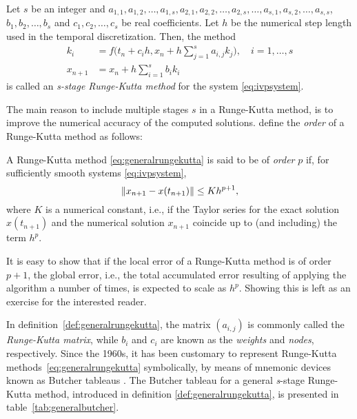\begin{defn}
    \label{def:generalrungekutta}
    Let $s$ be an integer and $a_{1,1},a_{1,2},\ldots,a_{1,s},a_{2,1},
    a_{2,2},\ldots,a_{2,s},\ldots,a_{s,1},a_{s,2},\ldots,a_{s,s}$,
    $b_{1},b_{2},\ldots,b_{s}$ and $c_{1},c_{2},\ldots,c_{s}$ be real
    coefficients. Let $h$ be the numerical step length used in the
    temporal discretization. Then, the method
\begin{equation}
    \label{eq:generalrungekutta}
    \begin{aligned}
        k_{i} &= f\bigg(t_{n}+c_{i}h,x_{n}+
                h\sum\limits_{j=1}^{s}a_{i,j}k_{j}\bigg),\quad{}i=1,\ldots,s\\
        x_{n+1} &= x_{n} + h\sum\limits_{i=1}^{s}b_{i}k_{i}
    \end{aligned}
\end{equation}
is called an \emph{s-stage Runge-Kutta method} for the system
\eqref{eq:ivpsystem}.
\end{defn}


The main reason to include multiple stages $s$ in a Runge-Kutta method,
is to improve the numerical accuracy of the computed solutions.
\textcite[p.134]{hairer1993solving} define the \emph{order}
of a Runge-Kutta method as follows:\\

\begin{defn}
    \label{def:rungekuttaorder}
    A Runge-Kutta method \eqref{eq:generalrungekutta} is said to be of
    \emph{order} $p$ if, for sufficiently smooth systems \eqref{eq:ivpsystem},
    \begin{equation}
        \label{eq:rungekuttaorder}
        \norm{x_{n+1}-x(t_{n+1})} \leq Kh^{p+1},
    \end{equation}
    where $K$ is a numerical constant, i.e., if the Taylor series for the exact
    solution $x(t_{n+1})$ and the numerical solution $x_{n+1}$ coincide up to
    (and including) the term $h^p$.
\end{defn}

It is easy to show that if the local error of a Runge-Kutta method is of order
$p+1$, the global error, i.e., the total accumulated error resulting of
applying the algorithm a number of times, is expected to scale as $h^{p}$.
Showing this is left as an exercise for the interested reader.

In definition~\ref{def:generalrungekutta}, the matrix $(a_{i,j})$ is commonly
called the \emph{Runge-Kutta matrix}, while $b_{i}$ and $c_{i}$ are known as
the \emph{weights} and \emph{nodes}, respectively.  Since the 1960s, it has
been customary to represent Runge-Kutta methods~\eqref{eq:generalrungekutta}
symbolically, by means of mnemonic devices known as Butcher tableaus
\parencite[p.134]{hairer1993solving}. The Butcher tableau
for a general \emph{s}-stage Runge-Kutta method, introduced in definition
\ref{def:generalrungekutta}, is presented in table~\ref{tab:generalbutcher}.

